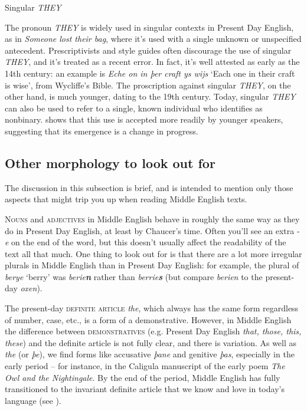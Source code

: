 \begin{miscbox}{Singular \emph{THEY}}

The pronoun \emph{THEY} is widely used in singular contexts in Present Day English, as in \emph{Someone lost their bag}, where it's used with a single unknown or unspecified antecedent. Prescriptivists and style guides often discourage the use of singular \emph{THEY}, and it's treated as a recent error. In fact, it's well attested as early as the 14th century: an example is \emph{Eche on in þer craft ys wijs} `Each one in their craft is wise', from Wycliffe's Bible. The proscription against singular \emph{THEY}, on the other hand, is much younger, dating to the 19th century. Today, singular \emph{THEY} can also be used to refer to a single, known individual who identifies as nonbinary. \citet[Chapter 3]{Conrod2019} shows that this use is accepted more readily by younger speakers, suggesting that its emergence is a change in progress.
\end{miscbox}


\subsection{Other morphology to look out for}

The discussion in this subsection is brief, and is intended to mention only those aspects that might trip you up when reading Middle English texts.

\textsc{Nouns} and \textsc{adjectives} in Middle English behave in roughly the same way as they do in Present Day English, at least by Chaucer's time. Often you'll see an extra -\emph{e} on the end of the word, but this doesn't usually affect the readability of the text all that much. One thing to look out for is that there are a lot more irregular plurals in Middle English than in Present Day English: for example, the plural of \emph{berye} `berry' was \emph{berie\textbf{n}} rather than \emph{berrie\textbf{s}} (but compare \textit{berien} to the present-day \textit{oxen}).

The present-day \textsc{definite article} \emph{the}, which always has the same form regardless of number, case, etc., is a  form of a demonstrative. However, in Middle English the difference between \textsc{demonstratives} (e.g. Present Day English \emph{that, those, this, these}) and the definite article is not fully clear, and there is variation. As well as \emph{the} (or \emph{þe}), we find forms like accusative \emph{þane} and genitive \emph{þas}, especially in the early period -- for instance, in the Caligula manuscript of the early poem \emph{The Owl and the Nightingale}. By the end of the period, Middle English has fully transitioned to the invariant definite article that we know and love in today's language (see \citealp[Chapter 6]{vanGelderen2011}).

